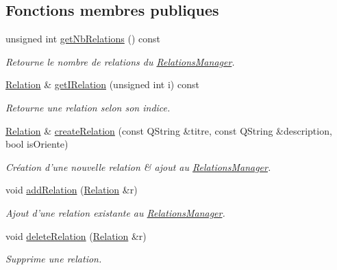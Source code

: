 \subsection*{Fonctions membres publiques}
\begin{DoxyCompactItemize}
\item 
\hypertarget{class_relations_manager_aad6d18cfe0018bc3c84cd67cc28e02e3}{unsigned int \hyperlink{class_relations_manager_aad6d18cfe0018bc3c84cd67cc28e02e3}{get\-Nb\-Relations} () const }\label{class_relations_manager_aad6d18cfe0018bc3c84cd67cc28e02e3}

\begin{DoxyCompactList}\small\item\em Retourne le nombre de relations du \hyperlink{class_relations_manager}{Relations\-Manager}. \end{DoxyCompactList}\item 
\hyperlink{class_relation}{Relation} \& \hyperlink{class_relations_manager_af3f2992fb1dc52df403ab0213232329d}{get\-I\-Relation} (unsigned int i) const 
\begin{DoxyCompactList}\small\item\em Retourne une relation selon son indice. \end{DoxyCompactList}\item 
\hyperlink{class_relation}{Relation} \& \hyperlink{class_relations_manager_a99ba92089cbce8ab93a1dd16380ead6c}{create\-Relation} (const Q\-String \&titre, const Q\-String \&description, bool is\-Oriente)
\begin{DoxyCompactList}\small\item\em Création d'une nouvelle relation \& ajout au \hyperlink{class_relations_manager}{Relations\-Manager}. \end{DoxyCompactList}\item 
void \hyperlink{class_relations_manager_a48e772342fa842c1832802e6e5e4ee4a}{add\-Relation} (\hyperlink{class_relation}{Relation} \&r)
\begin{DoxyCompactList}\small\item\em Ajout d'une relation existante au \hyperlink{class_relations_manager}{Relations\-Manager}. \end{DoxyCompactList}\item 
void \hyperlink{class_relations_manager_a5929bed08e90a52ec60f3a8cec09766d}{delete\-Relation} (\hyperlink{class_relation}{Relation} \&r)
\begin{DoxyCompactList}\small\item\em Supprime une relation. \end{DoxyCompactList}\item 

\end{DoxyCompactItemize}
